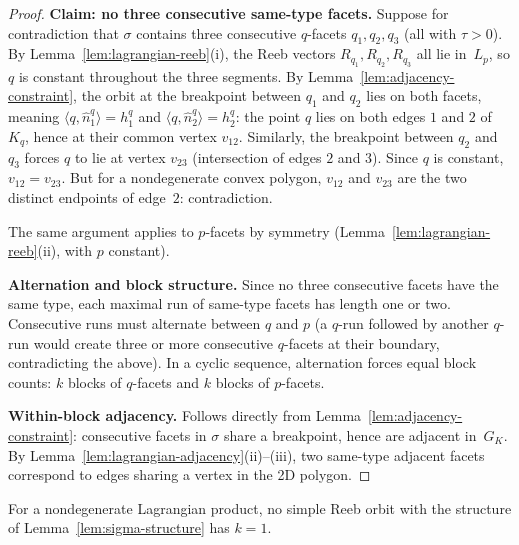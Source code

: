 \begin{proof}
\textbf{Claim: no three consecutive same-type facets.}\quad
Suppose for contradiction that $\sigma$ contains three
consecutive $q$-facets $q_1, q_2, q_3$ (all with $\tau > 0$).
By Lemma~\ref{lem:lagrangian-reeb}(i), the Reeb vectors
$R_{q_1}, R_{q_2}, R_{q_3}$ all lie in~$L_p$, so $q$ is
constant throughout the three segments.
By Lemma~\ref{lem:adjacency-constraint}, the orbit at the
breakpoint between $q_1$ and $q_2$ lies on both facets,
meaning $\langle q, \hat{n}_1^q \rangle = h_1^q$ and
$\langle q, \hat{n}_2^q \rangle = h_2^q$: the point $q$
lies on both edges $1$ and $2$ of~$K_q$, hence at their
common vertex $v_{12}$.
Similarly, the breakpoint between $q_2$ and $q_3$ forces $q$
to lie at vertex $v_{23}$ (intersection of edges $2$ and $3$).
Since $q$ is constant, $v_{12} = v_{23}$.
But for a nondegenerate convex polygon, $v_{12}$ and $v_{23}$
are the two distinct endpoints of edge~$2$: contradiction.

The same argument applies to $p$-facets by symmetry
(Lemma~\ref{lem:lagrangian-reeb}(ii), with $p$ constant).

\medskip\noindent
\textbf{Alternation and block structure.}\quad
Since no three consecutive facets have the same type, each maximal
run of same-type facets has length one or two.
Consecutive runs must alternate between $q$ and $p$ (a $q$-run
followed by another $q$-run would create three or more consecutive
$q$-facets at their boundary, contradicting the above).
In a cyclic sequence, alternation forces equal block counts:
$k$ blocks of $q$-facets and $k$ blocks of $p$-facets.

\medskip\noindent
\textbf{Within-block adjacency.}\quad
Follows directly from Lemma~\ref{lem:adjacency-constraint}:
consecutive facets in $\sigma$ share a breakpoint, hence are
adjacent in~$G_K$.
By Lemma~\ref{lem:lagrangian-adjacency}(ii)--(iii),
two same-type adjacent facets correspond to edges sharing a
vertex in the 2D polygon.
\end{proof}

\begin{lemma}[Infeasibility of $k = 1$]\label{lem:k1-infeasible}
For a nondegenerate Lagrangian product, no simple Reeb orbit with
the structure of Lemma~\ref{lem:sigma-structure} has $k = 1$.
\end{lemma}


